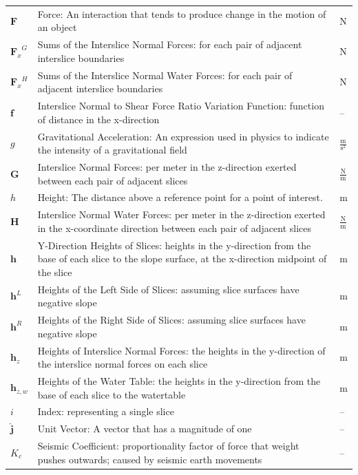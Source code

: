\documentclass[12pt]{article}
\begin{document}
\begin{longtabu}{l X[l] l}
$\mathbf{F}$ & Force: An interaction that tends to produce change in the motion of an object & N
\\
${{\mathbf{F}_{x}}^{G}}$ & Sums of the Interslice Normal Forces: for each pair of adjacent interslice boundaries & N
\\
${{\mathbf{F}_{x}}^{H}}$ & Sums of the Interslice Normal Water Forces: for each pair of adjacent interslice boundaries & N
\\
$\mathbf{f}$ & Interslice Normal to Shear Force Ratio Variation Function: function of distance in the x-direction & --
\\
$g$ & Gravitational Acceleration: An expression used in physics to indicate the intensity of a gravitational field & $\frac{\text{m}}{\text{s}^{2}}$
\\
$\mathbf{G}$ & Interslice Normal Forces: per meter in the z-direction exerted between each pair of adjacent slices & $\frac{\text{N}}{\text{m}}$
\\
$h$ & Height: The distance above a reference point for a point of interest. & m
\\
$\mathbf{H}$ & Interslice Normal Water Forces: per meter in the z-direction exerted in the x-coordinate direction between each pair of adjacent slices & $\frac{\text{N}}{\text{m}}$
\\
$\mathbf{h}$ & Y-Direction Heights of Slices: heights in the y-direction from the base of each slice to the slope surface, at the x-direction midpoint of the slice & m
\\
${\mathbf{h}^{L}}$ & Heights of the Left Side of Slices: assuming slice surfaces have negative slope & m
\\
${\mathbf{h}^{R}}$ & Heights of the Right Side of Slices: assuming slice surfaces have negative slope & m
\\
${\mathbf{h}_{z}}$ & Heights of Interslice Normal Forces: the heights in the y-direction of the interslice normal forces on each slice & m
\\
${\mathbf{h}_{z,w}}$ & Heights of the Water Table: the heights in the y-direction from the base of each slice to the watertable & m
\\
$i$ & Index: representing a single slice & --
\\
$\mathbf{\hat{j}}$ & Unit Vector: A vector that has a magnitude of one & --
\\
${K_{c}}$ & Seismic Coefficient: proportionality factor of force that weight pushes outwards; caused by seismic earth movements & --
\\

\end{longtabu}
\end{document}
